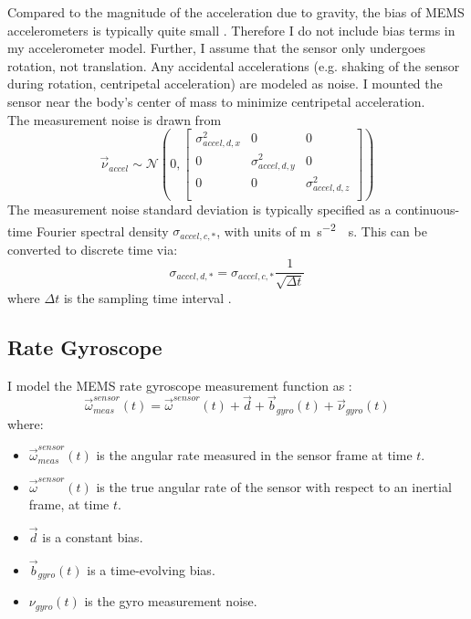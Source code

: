 \documentclass[conference]{IEEEtran}
\begin{document}
Compared to the magnitude of the acceleration due to gravity, the bias of MEMS accelerometers is typically quite small \cite{mpu9150, UCAM-CL-TR-696}. Therefore I do not include bias terms in my accelerometer model. Further, I assume that the sensor only undergoes rotation, not translation. Any accidental accelerations (e.g. shaking of the sensor during rotation, centripetal acceleration) are modeled as noise. I mounted the sensor near the body's center of mass to minimize centripetal acceleration.\\

The measurement noise is drawn from
\begin{equation}
  \vec{\nu}_{accel} \sim \mathcal{N}(0,
  \begin{bmatrix}
    \sigma_{accel,d,x}^2 & 0 & 0 \\
     0 & \sigma_{accel,d,y}^2 & 0 \\
     0 & 0 & \sigma_{accel,d,z}^2 \\
    \end{bmatrix}
  )
\end{equation}
The measurement noise standard deviation is typically specified as a continuous-time Fourier spectral density $\sigma_{accel,c,*}$, with units of \si{\meter\per\second\squared\sqrt\second}. This can be converted to discrete time via:
\begin{equation}
  \label{eqn:cont_to_desc_noise}
  \sigma_{accel,d,*} = \sigma_{accel,c,*} \frac{1}{\sqrt{\Delta t}}
\end{equation}
where $\Delta t$ is the sampling time interval \cite{1642588}.


\subsection{Rate Gyroscope}
I model the MEMS rate gyroscope measurement function as \cite{1642588}:
\begin{equation}
  \vec{\omega}_{meas}^{sensor}(t) = \vec{\omega}^{sensor}(t) + \vec{d} + \vec{b}_{gyro}(t) + \vec{\nu}_{gyro}(t)
\end{equation}
where:
\begin{itemize}
  \item $\vec{\omega}_{meas}^{sensor}(t)$ is the angular rate measured in the sensor frame at time $t$.
  \item $\vec{\omega}^{sensor}(t)$ is the true angular rate of the sensor with respect to an inertial frame, at time $t$.
  \item $\vec{d}$ is a constant bias.
  \item $\vec{b}_{gyro}(t)$ is a time-evolving bias.
  \item $\nu_{gyro}(t)$ is the gyro measurement noise.
\end{itemize}
\end{document}
